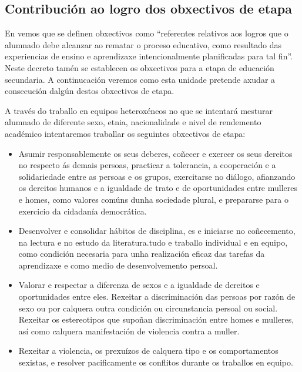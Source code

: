 \subsection{Contribución ao logro dos obxectivos de etapa}
En \cite{dogcurrlomce} vemos que se definen obxectivos como ``referentes relativos aos logros que o alumnado debe alcanzar ao rematar o proceso educativo, como resultado das experiencias de ensino e aprendizaxe intencionalmente planificadas para tal fin''. Neste decreto tamén se establecen os obxectivos para a etapa de educación secundaria. A continucación veremos como esta unidade pretende axudar a consecución dalgún destos obxectivos de etapa.

A través do traballo en equipos heteroxéneos no que se intentará mesturar alumnado de diferente sexo, etnia, nacionalidade e nivel de rendemento académico intentaremos traballar os seguintes obxectivos de etapa:

\begin{itemize}
    \item Asumir responsablemente os seus deberes, coñecer e exercer os seus dereitos no respecto ás demais persoas, practicar a tolerancia, a cooperación e a solidariedade entre as persoas e os grupos, exercitarse no diálogo, afianzando os dereitos humanos e a igualdade de trato e de oportunidades entre mulleres e homes, como valores comúns dunha sociedade plural, e prepararse para o exercicio da cidadanía democrática.

    \item Desenvolver e consolidar hábitos de disciplina, es e iniciarse no coñecemento, na lectura e no estudo da literatura.tudo e traballo individual e en equipo, como condición necesaria para unha realización eficaz das tarefas da aprendizaxe e como medio de desenvolvemento persoal.

    \item Valorar e respectar a diferenza de sexos e a igualdade de dereitos e oportunidades entre eles. Rexeitar a discriminación das persoas por razón de sexo ou por calquera outra condición ou circunstancia persoal ou social. Rexeitar os estereotipos que supoñan discriminación entre homes e mulleres, así como calquera manifestación de violencia contra a muller.

    \item Rexeitar a violencia, os prexuízos de calquera tipo e os comportamentos sexistas, e resolver pacificamente os conflitos durante os traballos en equipo.
\end{itemize}

